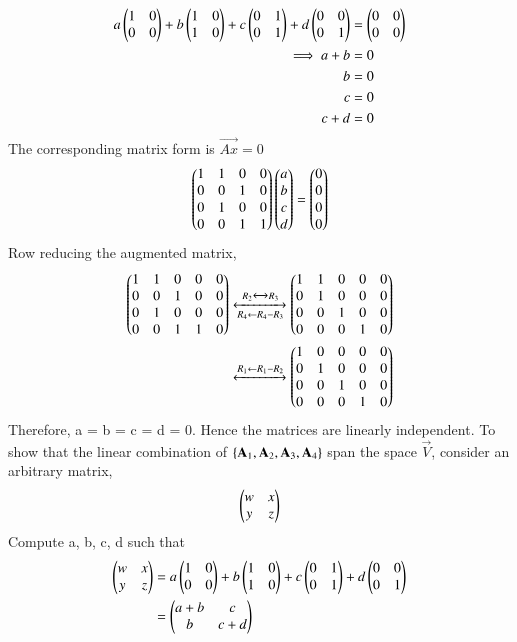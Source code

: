 \documentclass[journal,12pt,twocolumn]{IEEEtran}
\begin{document}
\begin{align}
	a\begin{pmatrix}1 & 0\\0 & 0\end{pmatrix} + b\begin{pmatrix}1 & 0\\1 & 0\end{pmatrix} + c\begin{pmatrix}0& 1\\0 & 1\end{pmatrix} + d\begin{pmatrix}0 & 0\\0 & 1\end{pmatrix} &= \begin{pmatrix}0 & 0 \\ 0 & 0\end{pmatrix}\\
	\implies a + b &= 0\\ 
	b &= 0\\
	c &= 0\\ 
	c + d &= 0
\end{align}
The corresponding matrix form is $\vec{Ax} = 0$
\begin{align}
	\begin{pmatrix}1 & 1& 0 & 0\\ 0 & 0 & 1 & 0\\ 0 & 1 & 0 & 0\\0 & 0 & 1 & 1\end{pmatrix}\begin{pmatrix}a\\b\\c\\d\end{pmatrix} = \begin{pmatrix}0\\0\\0\\0\end{pmatrix}
\end{align}
Row reducing the augmented matrix,
\begin{align}
	\begin{pmatrix}1 & 1& 0 & 0& 0\\ 0 & 0 & 1 & 0& 0\\ 0 & 1 & 0 & 0 &0\\0 & 0 & 1 & 1 & 0\end{pmatrix}
	\xleftrightarrow[R_4 \leftarrow R_4 - R_3]{R_2 \xleftrightarrow{} R_3}
	\begin{pmatrix}1 & 1& 0 & 0& 0\\ 0 & 1 & 0 & 0& 0\\ 0 & 0 & 1 & 0 &0\\0 & 0 & 0 & 1 & 0\end{pmatrix}\\
	\xleftrightarrow{R_1 \leftarrow R_1 - R_2}
	\begin{pmatrix}1 & 0& 0 & 0& 0\\ 0 & 1 & 0 & 0& 0\\ 0 & 0 & 1 & 0 &0\\0 & 0 & 0 & 1 & 0\end{pmatrix}
\end{align}
Therefore, a = b = c = d = 0. Hence the matrices are linearly independent. To show that the linear combination of $\left\{\mathbf{A}_1, \mathbf{A}_2, \mathbf{A}_3, \mathbf{A}_4\right\} $ span the space $\vec{V}$, consider an arbitrary matrix,
\begin{align}
	\begin{pmatrix}w & x\\ y & z\end{pmatrix}
\end{align} 
Compute a, b, c, d such that
\begin{align}
	\begin{pmatrix}w & x\\ y & z\end{pmatrix} &= a\begin{pmatrix}1 & 0\\0 & 0\end{pmatrix} + b\begin{pmatrix}1 & 0\\1 & 0\end{pmatrix} + c\begin{pmatrix}0& 1\\0 & 1\end{pmatrix} + d\begin{pmatrix}0 & 0\\0 & 1\end{pmatrix} \label{eq:eq1}\\
	&= \begin{pmatrix}a + b & c \\ b & c + d\end{pmatrix}
\end{align}
\end{document}
